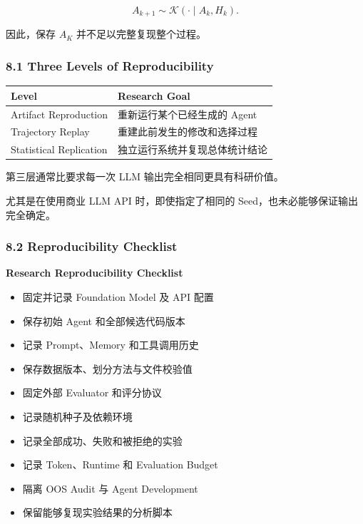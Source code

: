 \[A_{k+1}
\sim
\mathcal K(\cdot\mid A_k,H_k).\]

因此，保存 \(A_K\) 并不足以完整复现整个过程。

\hypertarget{part-3-48-0001-three-levels-of-reproducibility}{%
\subsubsection{8.1 Three Levels of Reproducibility}\label{part-3-48-0001-three-levels-of-reproducibility}}

\begin{readertable}
\begin{longtable}[]{@{}
  >{\raggedright\arraybackslash}p{}
  >{\raggedright\arraybackslash}p{}@{}}
\toprule
Level & Research Goal \\
\midrule
\endhead
Artifact Reproduction & 重新运行某个已经生成的 Agent \\
Trajectory Replay & 重建此前发生的修改和选择过程 \\
Statistical Replication & 独立运行系统并复现总体统计结论 \\
\bottomrule
\end{longtable}
\end{readertable}

第三层通常比要求每一次 LLM 输出完全相同更具有科研价值。

尤其是在使用商业 LLM API 时，即使指定了相同的 Seed，也未必能够保证输出完全确定。

\hypertarget{part-3-48-0001-reproducibility-checklist}{%
\subsubsection{8.2 Reproducibility Checklist}\label{part-3-48-0001-reproducibility-checklist}}

\textbf{Research Reproducibility Checklist}

\begin{itemize}
\item
  固定并记录 Foundation Model 及 API 配置
\item
  保存初始 Agent 和全部候选代码版本
\item
  记录 Prompt、Memory 和工具调用历史
\item
  保存数据版本、划分方法与文件校验值
\item
  固定外部 Evaluator 和评分协议
\item
  记录随机种子及依赖环境
\item
  记录全部成功、失败和被拒绝的实验
\item
  记录 Token、Runtime 和 Evaluation Budget
\item
  隔离 OOS Audit 与 Agent Development
\item
  保留能够复现实验结果的分析脚本
\end{itemize}

